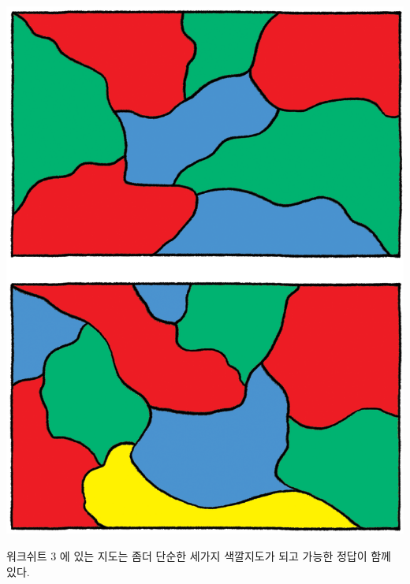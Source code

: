 \documentclass[]{article}
\begin{document}
\includegraphics{csunplugged/04-part/img/ch14-coloring/13-coloring-09-solution.png}

워크쉬트 3 에 있는 지도는 좀더 단순한 세가지 색깔지도가 되고 가능한
정답이 함께 있다.
\end{document}
